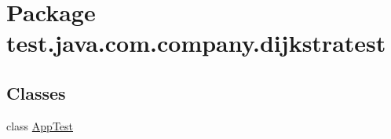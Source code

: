 \hypertarget{namespacetest_1_1java_1_1com_1_1company_1_1dijkstratest}{\section{Package test.\-java.\-com.\-company.\-dijkstratest}
\label{namespacetest_1_1java_1_1com_1_1company_1_1dijkstratest}
}
\subsection*{Classes}
\begin{DoxyCompactItemize}
\item 
class \hyperlink{classtest_1_1java_1_1com_1_1company_1_1dijkstratest_1_1_app_test}{App\-Test}
\end{DoxyCompactItemize}
